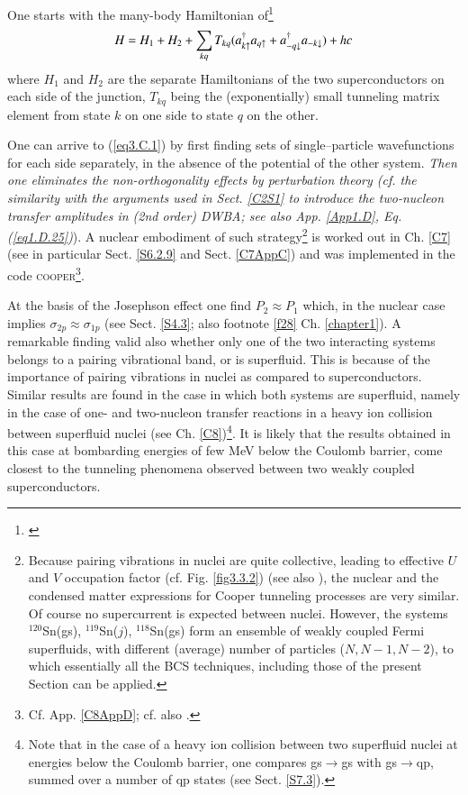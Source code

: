 One starts with the many-body Hamiltonian of\footnote{\cite{Cohen:62}}
\begin{align}\label{eq3.C.1}
H=H_1+H_2+\sum_{kq}T_{kq}(a_{k\uparrow}^\dagger a_{q\uparrow}+a_{-q\downarrow}^\dagger a_{-k\downarrow})+hc \idx{Weak link between superconductors!tunneling Hamiltonian}
\end{align}
where $H_1$ and $H_2$ are the separate Hamiltonians of the two superconductors on each side of the junction, $T_{kq}$ being the (exponentially) small tunneling matrix element from state $k$ on one side to state $q$ on the other.


One can arrive to  (\ref{eq3.C.1}) by first finding sets of single--particle wavefunctions for each side separately, in the absence of the potential of the other system. \textit{Then one eliminates the non-orthogonality effects by perturbation theory (cf. the similarity with the arguments used in Sect. \ref{C2S1} to introduce the two-nucleon transfer amplitudes in (2nd order) DWBA; see also App. \ref{App1.D}, Eq. (\ref{eq1.D.25})}). A nuclear embodiment of such strategy\footnote{\label{f45}Because  pairing vibrations in nuclei are quite collective, leading to effective $U$ and $V$ occupation factor (cf. Fig. \ref{fig3.3.2}) (see also \cite{Potel:13b}), the nuclear and the condensed matter expressions for Cooper tunneling processes are very similar. Of course no supercurrent is expected between nuclei. However, the systems $^{120}$Sn(gs), $^{119}$Sn($j$), $^{118}$Sn(gs) form an ensemble of weakly coupled Fermi superfluids, with different (average) number of particles ($N,N-1,N-2$), to which essentially all the BCS techniques, including those of the present Section can be applied.} is worked out in Ch. \ref{C7} (see in particular Sect. \ref{S6.2.9} and Sect. \ref{C7AppC}) and was implemented in the code \textsc{cooper}\footnote{Cf. App. \ref{C8AppD}; cf. also \cite{Broglia:04a}.}. 


At the basis of the Josephson effect one find $P_2\approx P_1$ which, in the nuclear case implies $\sigma_{2p}\approx\sigma_{1p}$ (see Sect. \ref{S4.3}; also footnote \ref{f28} Ch. \ref{chapter1}). A remarkable finding  valid also whether only one of the two interacting systems belongs to a  pairing vibrational band, or is superfluid. This is because of the importance of pairing vibrations in nuclei as compared to superconductors. Similar results are found in the case in which both systems are superfluid, namely in the case of  one- and two-nucleon transfer reactions in a heavy ion collision between superfluid nuclei (see Ch. \ref{C8})\footnote{Note that in the case of a heavy ion collision between two superfluid nuclei at energies below the Coulomb barrier, one compares gs$\to$gs with gs$\to$qp, summed over a number of qp states (see Sect. \ref{S7.3}).}. 
It is likely that the results obtained in this case at bombarding energies of few MeV below the Coulomb barrier, come closest to the tunneling phenomena observed between two weakly coupled superconductors.

